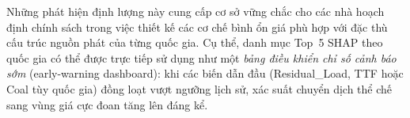 Những phát hiện định lượng này cung cấp cơ sở vững chắc cho các nhà hoạch định chính sách trong việc thiết kế các cơ chế bình ổn giá phù hợp với đặc thù cấu trúc nguồn phát của từng quốc gia. Cụ thể, danh mục Top~5 SHAP theo quốc gia có thể được trực tiếp sử dụng như một \textit{bảng điều khiển chỉ số cảnh báo sớm} (early-warning dashboard): khi các biến dẫn đầu (Residual\_Load, TTF hoặc Coal tùy quốc gia) đồng loạt vượt ngưỡng lịch sử, xác suất chuyển dịch thể chế sang vùng giá cực đoan tăng lên đáng kể.

